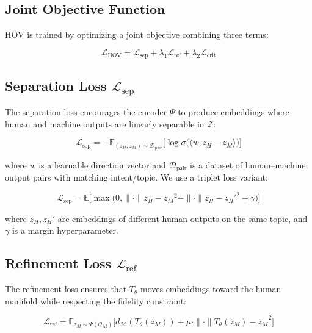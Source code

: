 \documentclass[12pt,oneside]{article}
\newcommand{\E}{\mathbb{E}}
\newcommand{\sigmoid}{\sigma}
\newcommand{\norm}{\|\cdot\|}
\begin{document}
\subsection{Joint Objective Function}

HOV is trained by optimizing a joint objective combining three terms:

\begin{equation}
\mathcal{L}_\text{HOV} = \mathcal{L}_\text{sep} + \lambda_1 \mathcal{L}_\text{ref} + \lambda_2 \mathcal{L}_\text{crit}
\end{equation}

\subsection{Separation Loss $\mathcal{L}_\text{sep}$}

The separation loss encourages the encoder $\Psi$ to produce embeddings where human and machine outputs are linearly separable in $\mathcal{Z}$:

\begin{equation}
\mathcal{L}_\text{sep} = -\E_{(z_H, z_M) \sim \mathcal{D}_\text{pair}} \Big[ \log \sigmoid\big(\langle w, z_H - z_M \rangle \big) \Big]
\end{equation}

where $w$ is a learnable direction vector and $\mathcal{D}_\text{pair}$ is a dataset of human--machine output pairs with matching intent/topic. We use a triplet loss variant:

\begin{equation}
\mathcal{L}_\text{sep} = \E \Big[ \max\big(0, \norm{z_H - z_M}^2 - \norm{z_H - z_H'}^2 + \gamma \big) \Big]
\end{equation}

where $z_H, z_H'$ are embeddings of different human outputs on the same topic, and $\gamma$ is a margin hyperparameter.

\subsection{Refinement Loss $\mathcal{L}_\text{ref}$}

The refinement loss ensures that $T_\theta$ moves embeddings toward the human manifold while respecting the fidelity constraint:

\begin{equation}
\mathcal{L}_\text{ref} = \E_{z_M \sim \Psi(\mathcal{O}_\text{AI})} \Big[ d_\mathcal{M}(T_\theta(z_M)) + \mu \cdot \norm{T_\theta(z_M) - z_M}^2 \Big]
\end{equation}
\end{document}
